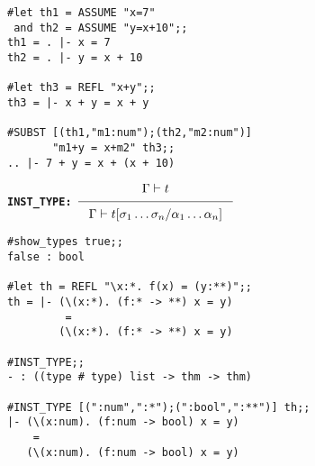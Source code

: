 
\vskip 4mm
\begin{session}\begin{verbatim}
#let th1 = ASSUME "x=7"
 and th2 = ASSUME "y=x+10";;
th1 = . |- x = 7
th2 = . |- y = x + 10

#let th3 = REFL "x+y";;
th3 = |- x + y = x + y

#SUBST [(th1,"m1:num");(th2,"m2:num")] 
       "m1+y = x+m2" th3;;
.. |- 7 + y = x + (x + 10)
\end{verbatim}\end{session}




\vskip10mm
\bspindent\LARGE\bf
{\Large\tt INST\_TYPE:\quad}
$\Rule{\Gamma \vdash t}
{ \Gamma \vdash t 
[ \sigma_1 \ldots \sigma_n / \alpha_1 \ldots \alpha_n]}$
\espindent

\vskip 7mm
\vskip 4mm
\begin{session}\begin{verbatim}
#show_types true;;
false : bool

#let th = REFL "\x:*. f(x) = (y:**)";;
th = |- (\(x:*). (f:* -> **) x = y) 
         = 
        (\(x:*). (f:* -> **) x = y)

#INST_TYPE;;
- : ((type # type) list -> thm -> thm)

#INST_TYPE [(":num",":*");(":bool",":**")] th;;
|- (\(x:num). (f:num -> bool) x = y)
    = 
   (\(x:num). (f:num -> bool) x = y)
\end{verbatim}\end{session}




\vskip10mm

